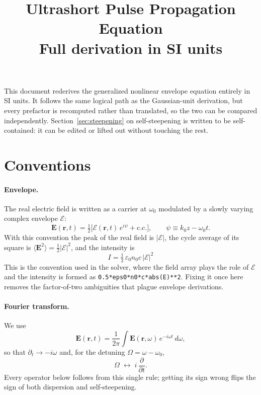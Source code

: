 \documentclass[11pt,a4paper]{article}
\title{Ultrashort Pulse Propagation Equation\\[0.3em]
       \large Full derivation in SI units}
\author{}
\date{}
\begin{document}
\maketitle

\noindent
This document rederives the generalized nonlinear envelope equation entirely in
SI units. It follows the same logical path as the Gaussian-unit derivation, but
every prefactor is recomputed rather than translated, so the two can be compared
independently. Section~\ref{sec:steepening} on self-steepening is written to be
self-contained: it can be edited or lifted out without touching the rest.

\tableofcontents

\section{Conventions}

\paragraph{Envelope.} The real electric field is written as a carrier at
$\omega_0$ modulated by a slowly varying complex envelope $\mathcal{E}$:
\begin{equation}
\label{eq:envelope-def}
\mathbf{E}(\mathbf{r},t)
 = \tfrac{1}{2}\big[\mathcal{E}(\mathbf{r},t)\,e^{i\psi} + \mathrm{c.c.}\big],
\qquad \psi \equiv k_0 z - \omega_0 t .
\end{equation}
With this convention the peak of the real field is $|\mathcal{E}|$, the cycle
average of its square is $\langle \mathbf{E}^2\rangle = \tfrac12|\mathcal{E}|^2$,
and the intensity is
\begin{equation}
\label{eq:intensity}
\boxed{\;I = \tfrac{1}{2}\,\varepsilon_0 n_0 c\,|\mathcal{E}|^2\;}
\end{equation}
This is the convention used in the solver, where the field array plays the role
of $\mathcal{E}$ and the intensity is formed as \texttt{0.5*eps0*n0*c*abs(E)**2}.
Fixing it once here removes the factor-of-two ambiguities that plague envelope
derivations.

\paragraph{Fourier transform.} We use
\begin{equation}
\mathbf{E}(\mathbf{r},t)=\frac{1}{2\pi}\int \mathbf{E}(\mathbf{r},\omega)\,
   e^{-i\omega t}\,d\omega ,
\end{equation}
so that $\partial_t \to -i\omega$ and, for the detuning $\Omega=\omega-\omega_0$,
\begin{equation}
\label{eq:detuning-rule}
\Omega \;\longleftrightarrow\; i\,\frac{\partial}{\partial t}.
\end{equation}
Every operator below follows from this single rule; getting its sign wrong flips
the sign of both dispersion and self-steepening.
\end{document}
